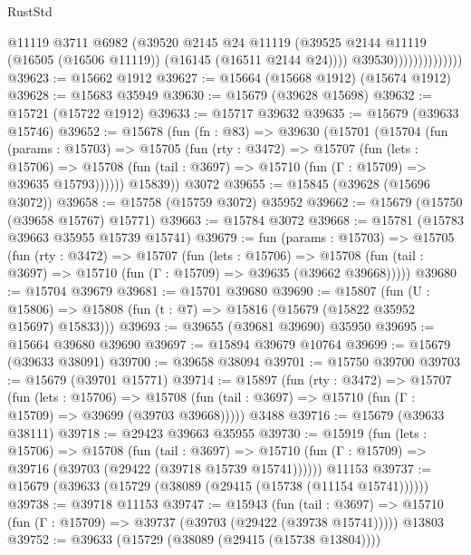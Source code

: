 \begin{lexlean}{RustStd}
\begin{coremodule}
                                @11119
                                @3711
                                @6982
                                (@39520
                                  @2145
                                  @24
                                  @11119
                                  (@39525
                                    @2144
                                    @11119
                                    (@16505 (@16506 @11119))
                                    (@16145 (@16511 @2144 @24))))
                                @39530))))))))))))))
@39623 := @15662 @1912
@39627 := @15664 (@15668 @1912) (@15674 @1912)
@39628 := @15683 @35949
@39630 := @15679 (@39628 @15698)
@39632 := @15721 (@15722 @1912)
@39633 := @15717 @39632
@39635 := @15679 (@39633 @15746)
@39652 := @15678
    (fun (fn : @83) =>
    @39630
      (@15701
        (@15704
          (fun (params : @15703) =>
          @15705
            (fun (rty : @3472) =>
            @15707
              (fun (lets : @15706) =>
              @15708 (fun (tail : @3697) => @15710 (fun (Γ : @15709) => @39635 @15793))))))
        @15839))
    @3072
@39655 := @15845 (@39628 (@15696 @3072))
@39658 := @15758 (@15759 @3072) @35952
@39662 := @15679 (@15750 (@39658 @15767) @15771)
@39663 := @15784 @3072
@39668 := @15781 (@15783 @39663 @35955 @15739 @15741)
@39679 := fun (params : @15703) =>
  @15705
    (fun (rty : @3472) =>
    @15707
      (fun (lets : @15706) =>
      @15708 (fun (tail : @3697) => @15710 (fun (Γ : @15709) => @39635 (@39662 @39668)))))
@39680 := @15704 @39679
@39681 := @15701 @39680
@39690 := @15807
    (fun (U : @15806) => @15808 (fun (t : @7) => @15816 (@15679 (@15822 @35952 @15697) @15833)))
@39693 := @39655 (@39681 @39690) @35950
@39695 := @15664 @39680 @39690
@39697 := @15894 @39679 @10764
@39699 := @15679 (@39633 @38091)
@39700 := @39658 @38094
@39701 := @15750 @39700
@39703 := @15679 (@39701 @15771)
@39714 := @15897
    (fun (rty : @3472) =>
    @15707
      (fun (lets : @15706) =>
      @15708 (fun (tail : @3697) => @15710 (fun (Γ : @15709) => @39699 (@39703 @39668)))))
    @3488
@39716 := @15679 (@39633 @38111)
@39718 := @29423 @39663 @35955
@39730 := @15919
    (fun (lets : @15706) =>
    @15708
      (fun (tail : @3697) =>
      @15710 (fun (Γ : @15709) => @39716 (@39703 (@29422 (@39718 @15739 @15741))))))
    @11153
@39737 := @15679 (@39633 (@15729 (@38089 (@29415 (@15738 (@11154 @15741))))))
@39738 := @39718 @11153
@39747 := @15943
    (fun (tail : @3697) => @15710 (fun (Γ : @15709) => @39737 (@39703 (@29422 (@39738 @15741)))))
    @13803
@39752 := @39633 (@15729 (@38089 (@29415 (@15738 @13804))))

\end{coremodule}
\end{lexlean}
